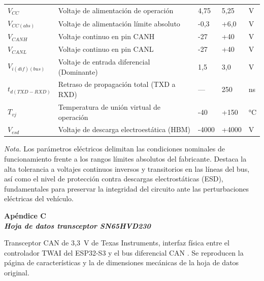 \begin{center}
	\begin{supertabular}{p{2.2cm} p{5.3cm} p{2.0cm} p{2.0cm} p{1.5cm}}
		$V_{CC}$ & Voltaje de alimentación de operación & 4,75 & 5,25 & V \\
		$V_{CC(abs)}$ & Voltaje de alimentación límite absoluto & -0,3 & +6,0 & V \\
		$V_{CANH}$ & Voltaje continuo en pin CANH & -27 & +40 & V \\
		$V_{CANL}$ & Voltaje continuo en pin CANL & -27 & +40 & V \\
		$V_{i(dif)(bus)}$ & Voltaje de entrada diferencial (Dominante) & 1,5 & 3,0 & V \\
		$t_{d(TXD-RXD)}$ & Retraso de propagación total (TXD a RXD) & — & 250 & ns \\
		$T_{vj}$ & Temperatura de unión virtual de operación & -40 & +150 & °C \\ 
		$V_{esd}$ & Voltaje de descarga electroestática (HBM) & -4000 & +4000 & V \\
	\end{supertabular}
\end{center}
{\raggedright\small\textit{Nota.} Los parámetros eléctricos delimitan las condiciones nominales de funcionamiento frente a los rangos límites absolutos del fabricante. Destaca la alta tolerancia a voltajes continuos inversos y transitorios en las líneas del bus, así como el nivel de protección contra descargas electrostáticas (ESD), fundamentales para preservar la integridad del circuito ante las perturbaciones eléctricas del vehículo.\par}


\newpage
\cleardoublepage %
\def\thesection{C} %
\label{anexo:sn65hvd230}
\begin{center}
	\bfseries Apéndice C \\
	\normalfont\bfseries\itshape Hoja de datos transceptor SN65HVD230
\end{center}

\vspace{4mm}

Transceptor CAN de 3{,}3~V de Texas Instruments, interfaz física entre el controlador TWAI del ESP32-S3 y el bus diferencial CAN \citep{sn65hvd230_datasheet}. Se reproducen la página de características y la de dimensiones mecánicas de la hoja de datos original.


